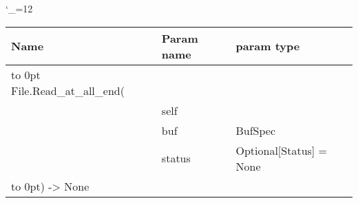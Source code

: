 \begingroup \catcode`\_=12 \tt
\begin{tabular}{lll}
\toprule
\textrm{Name}&\textrm{Param name}&\textrm{param type}\\
\midrule
\hbox to 0pt {File.Read_at_all_end(\hss}\\
& self\\
& buf & BufSpec\\
& status & Optional[Status] = None\\
\hbox to 0pt{) -> None\hss}\\
\bottomrule
\end{tabular}
\endgroup

